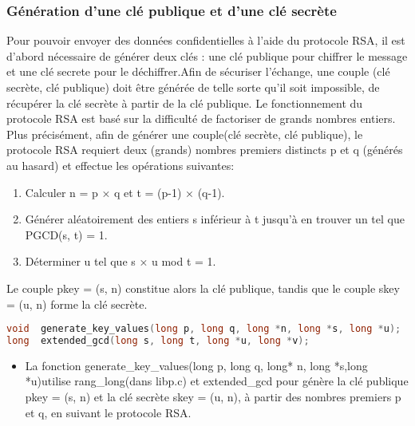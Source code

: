 \documentclass{article}
\begin{document}
\subsubsection{Génération d'une clé publique et d'une clé secrète}
Pour pouvoir envoyer des données confidentielles à l'aide du protocole RSA, il est d'abord nécessaire de générer deux clés : une clé publique pour chiffrer le message et une clé secrete pour le déchiffrer.Afin de sécuriser l'échange, une couple (clé secrète, clé publique) doit être générée de telle sorte qu'il soit impossible, de récupérer la clé secrète à partir de la clé publique. Le fonctionnement du protocole RSA est basé sur la difficulté de factoriser de grands nombres entiers. Plus précisément, afin de générer une couple(clé secrète, clé publique), le protocole RSA requiert deux (grands) nombres premiers distincts p et q (générés au hasard) et effectue les opérations suivantes:
\begin{enumerate}
    \item Calculer n = p × q et t = (p-1) × (q-1).
    \item Générer aléatoirement des entiers s inférieur à t jusqu'à en trouver un tel que PGCD(s, t) = 1.
    \item Déterminer u tel que s × u mod t = 1.
\end{enumerate}
Le couple pkey = (s, n) constitue alors la clé publique, tandis que le couple skey = (u, n) forme la clé secrète.\newline
\begin{lstlisting}[language={C}]
void  generate_key_values(long p, long q, long *n, long *s, long *u);
long  extended_gcd(long s, long t, long *u, long *v);
\end{lstlisting}
\begin{itemize}
\item La fonction generate\_key\_values(long p, long q, long* n, long *s,long *u)utilise rang\_long(dans libp.c) et extended\_gcd pour génère la clé publique pkey = (s, n) et la clé secrète skey = (u, n), à partir des nombres premiers p et q, en suivant le protocole RSA.
\end{itemize}
\end{document}
